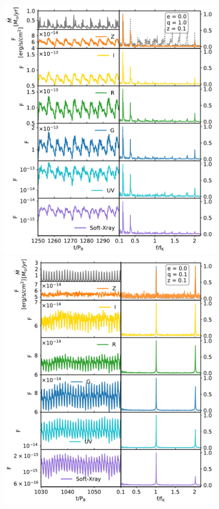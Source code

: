 \documentclass{aa}
\begin{document}
\begin{figure}
    \centering
    \includegraphics[width=\columnwidth]{Figures/e0q1_hr01_md001OpticAll_Flux_bands_10000_0.1_new.pdf}
    \includegraphics[width=\columnwidth]{Figures/e0q01_hr01_md001OpticAll_Flux_bands_7061_0.1_new.pdf}

\end{figure}
\end{document}
